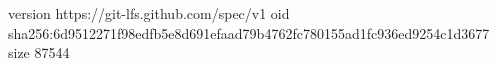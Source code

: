version https://git-lfs.github.com/spec/v1
oid sha256:6d9512271f98edfb5e8d691efaad79b4762fc780155ad1fc936ed9254c1d3677
size 87544
